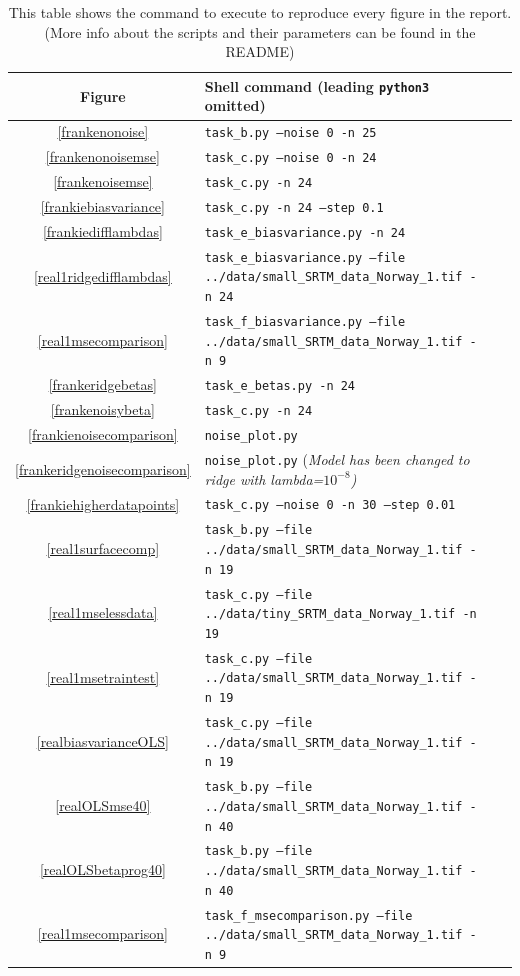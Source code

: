 \documentclass[twocolumn,10pt,cleanfoot]{asme2ej}
\begin{document}
\begin{table}
\caption{This table shows the command to execute to reproduce every figure in the report. (More info about the scripts and their parameters can be found in the README)}
\begin{center}
\label{allparamstable}
\begin{tabular}{c | l l l}
Figure & Shell command (leading \texttt{python3} omitted) \\
\hline
\ref{frankenonoise} & \texttt{task\_b.py --noise 0 -n 25}\\
\ref{frankenonoisemse} & \texttt{task\_c.py --noise 0 -n 24}\\
\ref{frankenoisemse} & \texttt{task\_c.py -n 24}\\
\ref{frankiebiasvariance} & \texttt{task\_c.py -n 24 --step 0.1}\\
\ref{frankiedifflambdas} & \texttt{task\_e\_biasvariance.py -n 24}\\
\ref{real1ridgedifflambdas} & \texttt{task\_e\_biasvariance.py --file ../data/small\_SRTM\_data\_Norway\_1.tif -n 24}\\
\ref{real1msecomparison} & \texttt{task\_f\_biasvariance.py --file ../data/small\_SRTM\_data\_Norway\_1.tif -n 9}\\
\ref{frankeridgebetas} & \texttt{task\_e\_betas.py -n 24}\\
\ref{frankenoisybeta} & \texttt{task\_c.py -n 24}\\
\ref{frankienoisecomparison} & \texttt{noise\_plot.py}\\
\ref{frankeridgenoisecomparison} & \texttt{noise\_plot.py} \footnotesize{(\it Model has been changed to ridge with lambda=$10^{-8}$)}\\
\ref{frankiehigherdatapoints} & \texttt{task\_c.py --noise 0 -n 30 --step 0.01}\\
\ref{real1surfacecomp} & \texttt{task\_b.py --file ../data/small\_SRTM\_data\_Norway\_1.tif -n 19}\\
\ref{real1mselessdata} & \texttt{task\_c.py --file ../data/tiny\_SRTM\_data\_Norway\_1.tif -n 19}\\
\ref{real1msetraintest} & \texttt{task\_c.py --file ../data/small\_SRTM\_data\_Norway\_1.tif -n 19}\\
\ref{realbiasvarianceOLS} & \texttt{task\_c.py --file ../data/small\_SRTM\_data\_Norway\_1.tif -n 19}\\
\ref{realOLSmse40} & \texttt{task\_b.py --file ../data/small\_SRTM\_data\_Norway\_1.tif -n 40}\\
\ref{realOLSbetaprog40} & \texttt{task\_b.py --file ../data/small\_SRTM\_data\_Norway\_1.tif -n 40}\\
\ref{real1msecomparison} & \texttt{task\_f\_msecomparison.py --file ../data/small\_SRTM\_data\_Norway\_1.tif -n 9}\\
\hline
\end{tabular}
\end{center}
\end{table}
\end{document}
